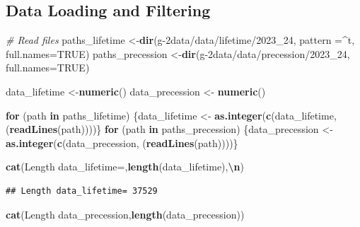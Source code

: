 \documentclass[
]{article}
\newenvironment{Shaded}{\begin{snugshade}}{\end{snugshade}}
\newcommand{\AttributeTok}[1]{\textcolor[rgb]{0.13,0.29,0.53}{#1}}
\newcommand{\CommentTok}[1]{\textcolor[rgb]{0.56,0.35,0.01}{\textit{#1}}}
\newcommand{\ConstantTok}[1]{\textcolor[rgb]{0.56,0.35,0.01}{#1}}
\newcommand{\ControlFlowTok}[1]{\textcolor[rgb]{0.13,0.29,0.53}{\textbf{#1}}}
\newcommand{\FunctionTok}[1]{\textcolor[rgb]{0.13,0.29,0.53}{\textbf{#1}}}
\newcommand{\NormalTok}[1]{#1}
\newcommand{\OtherTok}[1]{\textcolor[rgb]{0.56,0.35,0.01}{#1}}
\newcommand{\SpecialCharTok}[1]{\textcolor[rgb]{0.81,0.36,0.00}{\textbf{#1}}}
\newcommand{\StringTok}[1]{\textcolor[rgb]{0.31,0.60,0.02}{#1}}
\begin{document}
\subsection{Data Loading and
Filtering}\label{data-loading-and-filtering}

\begin{Shaded}
\begin{Highlighting}[]
\CommentTok{\# Read files}
\NormalTok{paths\_lifetime   }\OtherTok{\textless{}{-}}\FunctionTok{dir}\NormalTok{(}\StringTok{\textquotesingle{}g{-}2data/data/lifetime/2023\_24\textquotesingle{}}\NormalTok{, }\AttributeTok{pattern =}\StringTok{\textquotesingle{}\^{}t\textquotesingle{}}\NormalTok{, }\AttributeTok{full.names=}\ConstantTok{TRUE}\NormalTok{)}
\NormalTok{paths\_precession }\OtherTok{\textless{}{-}}\FunctionTok{dir}\NormalTok{(}\StringTok{\textquotesingle{}g{-}2data/data/precession/2023\_24\textquotesingle{}}\NormalTok{, }\AttributeTok{full.names=}\ConstantTok{TRUE}\NormalTok{)}

\NormalTok{data\_lifetime   }\OtherTok{\textless{}{-}}\FunctionTok{numeric}\NormalTok{()}
\NormalTok{data\_precession }\OtherTok{\textless{}{-}} \FunctionTok{numeric}\NormalTok{()}

\ControlFlowTok{for}\NormalTok{ (path }\ControlFlowTok{in}\NormalTok{ paths\_lifetime)   \{data\_lifetime   }\OtherTok{\textless{}{-}} \FunctionTok{as.integer}\NormalTok{(}\FunctionTok{c}\NormalTok{(data\_lifetime, (}\FunctionTok{readLines}\NormalTok{(path))))\}}
\ControlFlowTok{for}\NormalTok{ (path }\ControlFlowTok{in}\NormalTok{ paths\_precession) \{data\_precession }\OtherTok{\textless{}{-}} \FunctionTok{as.integer}\NormalTok{(}\FunctionTok{c}\NormalTok{(data\_precession, (}\FunctionTok{readLines}\NormalTok{(path))))\}}

\FunctionTok{cat}\NormalTok{(}\StringTok{\textquotesingle{}Length data\_lifetime=\textquotesingle{}}\NormalTok{,}\FunctionTok{length}\NormalTok{(data\_lifetime),}\StringTok{\textquotesingle{}}\SpecialCharTok{\textbackslash{}n}\StringTok{\textquotesingle{}}\NormalTok{)}
\end{Highlighting}
\end{Shaded}

\begin{verbatim}
## Length data_lifetime= 37529
\end{verbatim}

\begin{Shaded}
\begin{Highlighting}[]
\FunctionTok{cat}\NormalTok{(}\StringTok{\textquotesingle{}Length data\_precession\textquotesingle{}}\NormalTok{,}\FunctionTok{length}\NormalTok{(data\_precession))}
\end{Highlighting}
\end{Shaded}
\end{document}
